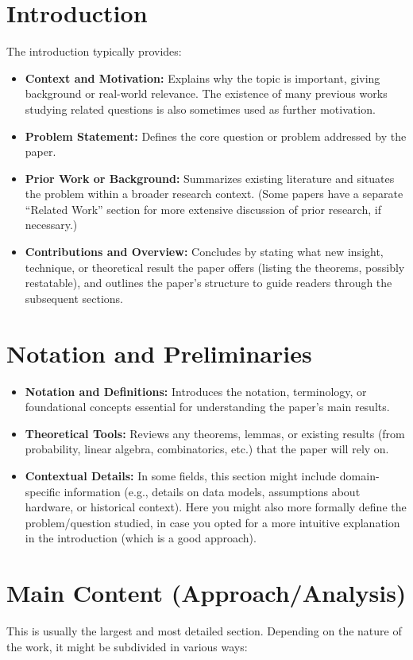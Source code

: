 \section{Introduction}
The introduction typically provides:
\begin{itemize}
    \item \textbf{Context and Motivation:} Explains why the topic is important, giving background or real-world relevance. The existence of many previous works studying related questions is also sometimes used as further motivation.
    \item \textbf{Problem Statement:} Defines the core question or problem addressed by the paper.
    \item \textbf{Prior Work or Background:} Summarizes existing literature and situates the problem within a broader research context. (Some papers have a separate “Related Work” section for more extensive discussion of prior research, if necessary.)
    \item \textbf{Contributions and Overview:} Concludes by stating what new insight, technique, or theoretical result the paper offers (listing the theorems, possibly restatable), and outlines the paper’s structure to guide readers through the subsequent sections.
\end{itemize}

\section{Notation and Preliminaries}
\begin{itemize}
    \item \textbf{Notation and Definitions:} Introduces the notation, terminology, or foundational concepts essential for understanding the paper’s main results.
    \item \textbf{Theoretical Tools:} Reviews any theorems, lemmas, or existing results (from probability, linear algebra, combinatorics, etc.) that the paper will rely on.
    \item \textbf{Contextual Details:} In some fields, this section might include domain-specific information (e.g., details on data models, assumptions about hardware, or historical context). Here you might also more formally define the problem/question studied, in case you opted for a more intuitive explanation in the introduction (which is a good approach).
\end{itemize}

\section{Main Content (Approach/Analysis)}
This is usually the largest and most detailed section. Depending on the nature of the work, it might be subdivided in various ways:

